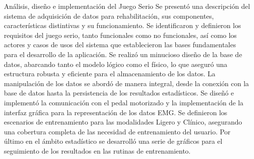 \begin{thesischapter}{2} {Análisis, diseño e implementación del Juego Serio}
Se presentó una descripción del sistema de adquisición de datos para rehabilitación, sus componentes,
características distintivas y su funcionamiento. Se identificaron y definieron los requisitos del juego 
serio, tanto funcionales como no funcionales, así como los actores y casos de usos del sistema que establecieron 
las bases fundamentales para el desarrollo de la aplicación. Se realizó un minucioso diseño de la base de datos, 
abarcando tanto el modelo lógico como el físico, lo que aseguró una estructura robusta y eficiente para el 
almacenamiento de los datos. La manipulación de los datos se abordó de manera integral, desde la conexión con 
la base de datos hasta la persistencia de los resultados estadísticos. Se diseñó e implementó la comunicación
con el pedal motorizado y la implementación de la interfaz gráfica para la representación de los datos EMG. 
Se definieron los escenarios de entrenamiento para las modalidades Ligero y Clínico, asegurando 
una cobertura completa de las necesidad de entrenamiento del usuario. Por último en el ámbito estadístico se desarrolló 
una serie de gráficos para el seguimiento de los resultados en las rutinas de entrenamiento.   
    
\end{thesischapter}